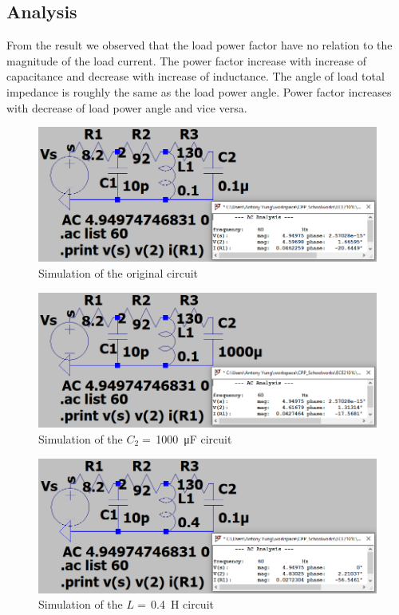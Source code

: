 \documentclass{article}
\begin{document}
\subsection*{Analysis}
From the result we observed that the load power factor have no relation to the magnitude of the load current. The power factor increase with increase of capacitance and decrease with increase of inductance. The angle of load total impedance is roughly the same as the load power angle. Power factor increases with decrease of load power angle and vice versa.


\newpage
\begin{figure}[H]
    \centering
        \includegraphics[width=\textwidth]{ECE2101L_Lab09_B1_original.png}
        \caption{Simulation of the original circuit}
\end{figure}

\begin{figure}[H]
    \centering
        \includegraphics[width=\textwidth]{ECE2101L_Lab09_B1_1000u.png}
        \caption{Simulation of the $C_2=$\,\SI{1000}{\micro\farad} circuit}
\end{figure}

\begin{figure}[H]
    \centering
        \includegraphics[width=\textwidth]{ECE2101L_Lab09_B1_0.4H.png}
        \caption{Simulation of the $L=$\,\SI{0.4}{\henry} circuit}
\end{figure}
\end{document}
